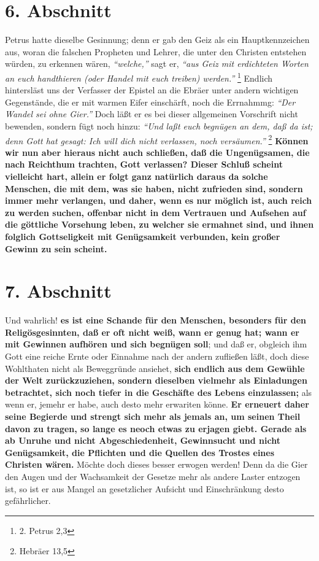 \section{6. Abschnitt} \label{kap13_ab6}

Petrus  hatte dieselbe Gesinnung; denn er gab den Geiz als ein Hauptkennzeichen
aus, woran die falschen Propheten und Lehrer, die unter den Christen entstehen
würden, zu erkennen wären,  \textit{"`welche,"'} sagt er, \textit{"`aus Geiz mit erdichteten
Worten an euch handthieren (oder Handel mit euch treiben) werden."'}
\footnote{2. Petrus 2,3}
Endlich hintersläst uns der Verfasser der Epistel an die Ebräer
unter andern wichtigen Gegenstände, die er mit warmen Eifer einschärft, noch die
Errnahmmg: \textit{"`Der Wandel sei ohne Gier."'} Doch läßt er es bei dieser allgemeinen
Vorschrift nicht bewenden, sondern fügt noch hinzu:
\textit{"`Und laßt euch begnügen an
dem, daß da ist; denn Gott hat gesagt: Ich will dich nicht verlassen, noch
versäumen."'}
\footnote{Hebräer 13,5}
\textbf{Können wir nun aber hieraus nicht auch
schließen, daß die Ungenügsamen, die nach Reichthum trachten, Gott verlassen?
Dieser Schluß scheint vielleicht hart, allein er folgt ganz natürlich daraus da
solche Menschen, die mit dem, was sie haben, nicht zufrieden sind, sondern immer
mehr verlangen, und daher, wenn es nur möglich ist, auch reich zu werden suchen,
offenbar nicht in dem Vertrauen und Aufsehen auf die göttliche Vorsehung leben,
zu welcher sie ermahnet sind, und ihnen folglich Gottseligkeit mit Genügsamkeit
verbunden, kein großer Gewinn zu sein scheint.}

\section{7. Abschnitt} \label{kap13_ab7}

  Und wahrlich! \textbf{es ist eine Schande für den Menschen, besonders für den
Religösgesinnten, daß er oft nicht weiß, wann er genug hat; wann er mit Gewinnen
aufhören und sich begnügen soll}; und daß er, obgleich ihm Gott eine reiche Ernte
oder Einnahme nach der andern zufließen läßt, doch diese Wohlthaten nicht als
Beweggründe ansiehet, \textbf{sich endlich aus dem Gewühle der Welt zurückzuziehen,
sondern dieselben vielmehr als Einladungen betrachtet, sich noch tiefer in die
Geschäfte des Lebens einzulassen;} als wenn er, jemehr er habe, auch desto mehr
erwariten könne. \textbf{Er erneuert daher seine Begierde und strengt sich mehr als
jemals an, um seinen Theil davon zu tragen, so lange es neoch etwas zu erjagen
giebt. Gerade als ab Unruhe und nicht Abgeschiedenheit, Gewinnsucht und nicht
Genügsamkeit, die Pflichten und die Quellen des Trostes eines Christen wären.}
Möchte doch dieses besser erwogen werden! Denn da die Gier den Augen und der
Wachsamkeit der Gesetze mehr als andere Laster entzogen ist, so ist er aus
 Mangel an gesetzlicher Aufsicht und Einschränkung desto gefährlicher.

